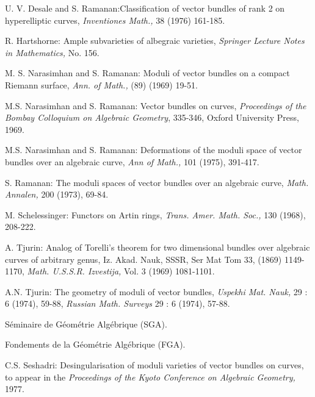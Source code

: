 \begin{thebibliography}{}
 U. V. Desale and S. Ramanan:\pageoriginale Classification of
vector bundles of rank 2 on hyperelliptic curves, {\em Inventiones
Math.,} 38 (1976) 161-185.

 R. Hartshorne: Ample subvarieties of albegraic
varieties, {\em Springer Lecture Notes in Mathematics,} No. 156.

 M. S. Narasimhan and S. Ramanan: Moduli of vector
bundles on a compact Riemann surface, {\em Ann. of Math.,} (89) (1969)
19-51. 

 M.S. Narasimhan and S. Ramanan: Vector bundles on
curves, {\em Proceedings of the Bombay Colloquium on Algebraic
Geometry}, 335-346, Oxford University Press, 1969.

 M.S. Narasimhan and S. Ramanan: Deformations of
the moduli space of vector bundles over an algebraic curve, {\em Ann
of Math.,} 101 (1975), 391-417.

 S. Ramanan: The moduli spaces of vector bundles
over an algebraic curve, {\em Math. Annalen,} 200 (1973), 69-84.

 M. Schelessinger: Functors on Artin rings, {\em
Trans. Amer. Math. Soc.,} 130 (1968), 208-222.

 A. Tjurin: Analog of Torelli's theorem for two
dimensional bundles over algebraic curves of arbitrary genus,
Iz. Akad. Nauk, SSSR, Ser Mat Tom 33, (1869) 1149-1170, {\em
Math. U.S.S.R. Izvestija,} Vol. 3 (1969) 1081-1101.

 A.N. Tjurin: The geometry of moduli of vector
bundles, {\em Uspekhi Mat. Nauk,} 29 : 6 (1974), 59-88, {\em Russian
Math. Surveys} 29 : 6 (1974), 57-88.

 S\'eminaire de G\'eom\'etrie Alg\'ebrique (SGA).

 Fondements de la G\'eom\'etrie Alg\'ebrique (FGA).

 C.S. Seshadri: Desingularisation of moduli
varieties of vector bundles on curves, to appear in the {\em
Proceedings of the Kyoto Conference on Algebraic Geometry,} 1977.

\end{thebibliography}

\vfill\eject
~\phantom{a}
\thispagestyle{empty}
